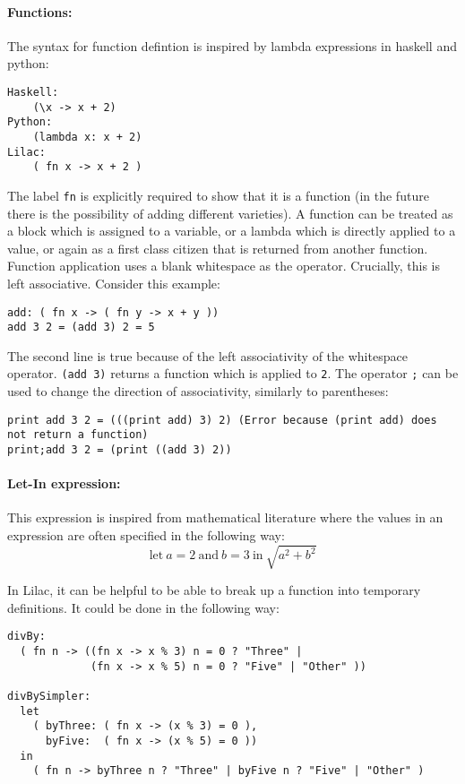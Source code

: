 \documentclass[a4paper, 12pt]{article}
\begin{document}
\paragraph{Functions:}
The syntax for function defintion is inspired by lambda expressions in haskell and python:\\
\begin{verbatim}
Haskell:
	(\x -> x + 2)
Python:
	(lambda x: x + 2)
Lilac:
	( fn x -> x + 2 )
\end{verbatim}

The label \verb|fn| is explicitly required to show that it is a function (in the future there is the possibility of adding different varieties). A function can be treated as a block which is assigned to a variable, or a lambda which is directly applied to a value, or again as a first class citizen that is returned from another function. Function application uses a blank whitespace as the operator. Crucially, this is left associative. Consider this example:
\begin{verbatim}
add: ( fn x -> ( fn y -> x + y ))
add 3 2 = (add 3) 2 = 5
\end{verbatim}

The second line is true because of the left associativity of the whitespace operator. \verb|(add 3)| returns a function which is applied to \verb|2|. The operator \verb|;| can be used to change the direction of associativity, similarly to parentheses:\\
\begin{verbatim}
print add 3 2 = (((print add) 3) 2) (Error because (print add) does not return a function)
print;add 3 2 = (print ((add 3) 2))
\end{verbatim}

\paragraph{Let-In expression:}
This expression is inspired from mathematical literature where the values in an expression are often specified in the following way:\\

\[ \text{let}\ a=2\ \text{and}\ b=3\ \text{in}\ \sqrt{a^2+b^2} \]

In Lilac, it can be helpful to be able to break up a function into temporary definitions. It could be done in the following way:\\
\begin{verbatim}
divBy:
  ( fn n -> ((fn x -> x % 3) n = 0 ? "Three" | 
             (fn x -> x % 5) n = 0 ? "Five" | "Other" ))

divBySimpler:
  let 
    ( byThree: ( fn x -> (x % 3) = 0 ),
      byFive:  ( fn x -> (x % 5) = 0 ))
  in
    ( fn n -> byThree n ? "Three" | byFive n ? "Five" | "Other" )
\end{verbatim}
\end{document}
